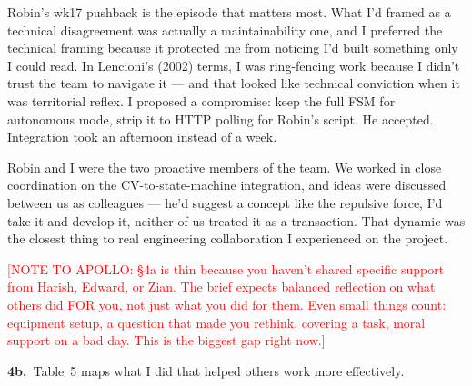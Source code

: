 Robin's wk17 pushback is the episode that matters most. What I'd framed as a technical disagreement was actually a maintainability one, and I preferred the technical framing because it protected me from noticing I'd built something only I could read. In Lencioni's (2002) terms, I was ring-fencing work because I didn't trust the team to navigate it --- and that looked like technical conviction when it was territorial reflex. I proposed a compromise: keep the full FSM for autonomous mode, strip it to HTTP polling for Robin's script. He accepted. Integration took an afternoon instead of a week.

Robin and I were the two proactive members of the team. We worked in close coordination on the CV-to-state-machine integration, and ideas were discussed between us as colleagues --- he'd suggest a concept like the repulsive force, I'd take it and develop it, neither of us treated it as a transaction. That dynamic was the closest thing to real engineering collaboration I experienced on the project.

\textcolor{red}{[NOTE TO APOLLO: \S4a is thin because you haven't shared specific support from Harish, Edward, or Zian. The brief expects balanced reflection on what others did FOR you, not just what you did for them. Even small things count: equipment setup, a question that made you rethink, covering a task, moral support on a bad day. This is the biggest gap right now.]}

\textbf{4b.}~Table~5 maps what I did that helped others work more effectively.

